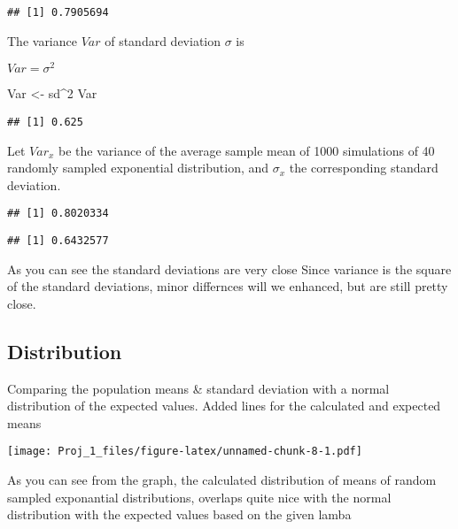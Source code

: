 \documentclass[]{article}
\newenvironment{Shaded}{\begin{snugshade}}{\end{snugshade}}
\newcommand{\KeywordTok}[1]{\textcolor[rgb]{0.13,0.29,0.53}{\textbf{#1}}}
\newcommand{\DecValTok}[1]{\textcolor[rgb]{0.00,0.00,0.81}{#1}}
\newcommand{\StringTok}[1]{\textcolor[rgb]{0.31,0.60,0.02}{#1}}
\newcommand{\OperatorTok}[1]{\textcolor[rgb]{0.81,0.36,0.00}{\textbf{#1}}}
\newcommand{\NormalTok}[1]{#1}
\begin{document}
\begin{verbatim}
## [1] 0.7905694
\end{verbatim}

The variance \(Var\) of standard deviation \(\sigma\) is

\(Var = \sigma^2\)

\begin{Shaded}
\begin{Highlighting}[]
\NormalTok{Var <-}\StringTok{ }\NormalTok{sd}\OperatorTok{^}\DecValTok{2}
\NormalTok{Var}
\end{Highlighting}
\end{Shaded}

\begin{verbatim}
## [1] 0.625
\end{verbatim}

Let \(Var_x\) be the variance of the average sample mean of 1000
simulations of 40 randomly sampled exponential distribution, and
\(\sigma_x\) the corresponding standard deviation.

\begin{Shaded}
\end{Shaded}

\begin{verbatim}
## [1] 0.8020334
\end{verbatim}

\begin{Shaded}
\end{Shaded}

\begin{verbatim}
## [1] 0.6432577
\end{verbatim}

As you can see the standard deviations are very close Since variance is
the square of the standard deviations, minor differnces will we
enhanced, but are still pretty close.

\subsection{Distribution}\label{distribution}

Comparing the population means \& standard deviation with a normal
distribution of the expected values. Added lines for the calculated and
expected means

\texttt{[image: Proj\_1\_files/figure-latex/unnamed-chunk-8-1.pdf]}

As you can see from the graph, the calculated distribution of means of
random sampled exponantial distributions, overlaps quite nice with the
normal distribution with the expected values based on the given lamba
\end{document}
